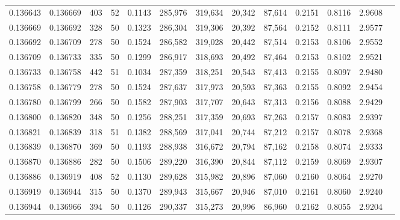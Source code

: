 \begin{tabular}{rrrrrrrrrrrrr}
0.136643 & 0.136669 &   403 &  52 &                                     0.1143 & 285,976 & 319,634 &  20,342 &  87,614 & 0.2151 & 0.8116 & 2.9608 \\
0.136669 & 0.136692 &   328 &  50 &                                     0.1323 & 286,304 & 319,306 &  20,392 &  87,564 & 0.2152 & 0.8111 & 2.9577 \\
0.136692 & 0.136709 &   278 &  50 &                                     0.1524 & 286,582 & 319,028 &  20,442 &  87,514 & 0.2153 & 0.8106 & 2.9552 \\
0.136709 & 0.136733 &   335 &  50 &                                     0.1299 & 286,917 & 318,693 &  20,492 &  87,464 & 0.2153 & 0.8102 & 2.9521 \\
0.136733 & 0.136758 &   442 &  51 &                                     0.1034 & 287,359 & 318,251 &  20,543 &  87,413 & 0.2155 & 0.8097 & 2.9480 \\
0.136758 & 0.136779 &   278 &  50 &                                     0.1524 & 287,637 & 317,973 &  20,593 &  87,363 & 0.2155 & 0.8092 & 2.9454 \\
0.136780 & 0.136799 &   266 &  50 &                                     0.1582 & 287,903 & 317,707 &  20,643 &  87,313 & 0.2156 & 0.8088 & 2.9429 \\
0.136800 & 0.136820 &   348 &  50 &                                     0.1256 & 288,251 & 317,359 &  20,693 &  87,263 & 0.2157 & 0.8083 & 2.9397 \\
0.136821 & 0.136839 &   318 &  51 &                                     0.1382 & 288,569 & 317,041 &  20,744 &  87,212 & 0.2157 & 0.8078 & 2.9368 \\
0.136839 & 0.136870 &   369 &  50 &                                     0.1193 & 288,938 & 316,672 &  20,794 &  87,162 & 0.2158 & 0.8074 & 2.9333 \\
0.136870 & 0.136886 &   282 &  50 &                                     0.1506 & 289,220 & 316,390 &  20,844 &  87,112 & 0.2159 & 0.8069 & 2.9307 \\
0.136886 & 0.136919 &   408 &  52 &                                     0.1130 & 289,628 & 315,982 &  20,896 &  87,060 & 0.2160 & 0.8064 & 2.9270 \\
0.136919 & 0.136944 &   315 &  50 &                                     0.1370 & 289,943 & 315,667 &  20,946 &  87,010 & 0.2161 & 0.8060 & 2.9240 \\
0.136944 & 0.136966 &   394 &  50 &                                     0.1126 & 290,337 & 315,273 &  20,996 &  86,960 & 0.2162 & 0.8055 & 2.9204 \\

\end{tabular}
